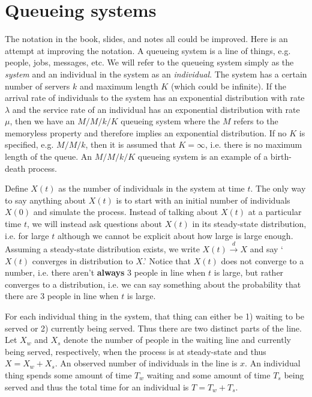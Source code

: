 \documentclass{article}
\begin{document}
\section{Queueing systems}

The notation in the book, slides, and notes all could be improved. Here is an attempt at improving the notation. A queueing system is a line of things, e.g. people, jobs, messages, etc. We will refer to the queueing system simply as the \emph{system} and an individual in the system as an \emph{individual}. The system has a certain number of servers $k$ and maximum length $K$ (which could be infinite). If the arrival rate of individuals to the system has an exponential distribution with rate $\lambda$ and the service rate of an individual has an exponential distribution with rate $\mu$, then we have an $M/M/k/K$ queueing system where the $M$ refers to the memoryless property and therefore implies an exponential distribution. If no $K$ is specified, e.g. $M/M/k$, then it is assumed that $K=\infty$, i.e. there is no maximum length of the queue. An $M/M/k/K$ queueing system is an example of a birth-death process. 

Define $X(t)$ as the number of individuals in the system at time $t$. The only way to say anything about $X(t)$ is to start with an initial number of individuals $X(0)$ and simulate the process. Instead of talking about $X(t)$ at a particular time $t$, we will instead ask questions about $X(t)$ in its steady-state distribution, i.e. for large $t$ although we cannot be explicit about how large is large enough. Assuming a steady-state distribution exists, we write $X(t)\stackrel{d}{\rightarrow} X$ and say `$X(t)$ converges in distribution to $X$.' Notice that $X(t)$ does not converge to a number, i.e. there aren't {\bf always} 3 people in line when $t$ is large, but rather converges to a distribution, i.e. we can say something about the probability that there are 3 people in line when $t$ is large. 

For each individual thing in the system, that thing can either be 1) waiting to be served or 2) currently being served. Thus there are two distinct parts of the line. Let $X_w$ and $X_s$ denote the number of people in the waiting line and currently being served, respectively, when the process is at steady-state and thus $X=X_w+X_s$. An observed number of individuals in the line is $x$. An individual thing spends some amount of time $T_w$ waiting and some amount of time $T_s$ being served and thus the total time for an individual is $T=T_w+T_s$. 
\end{document}
